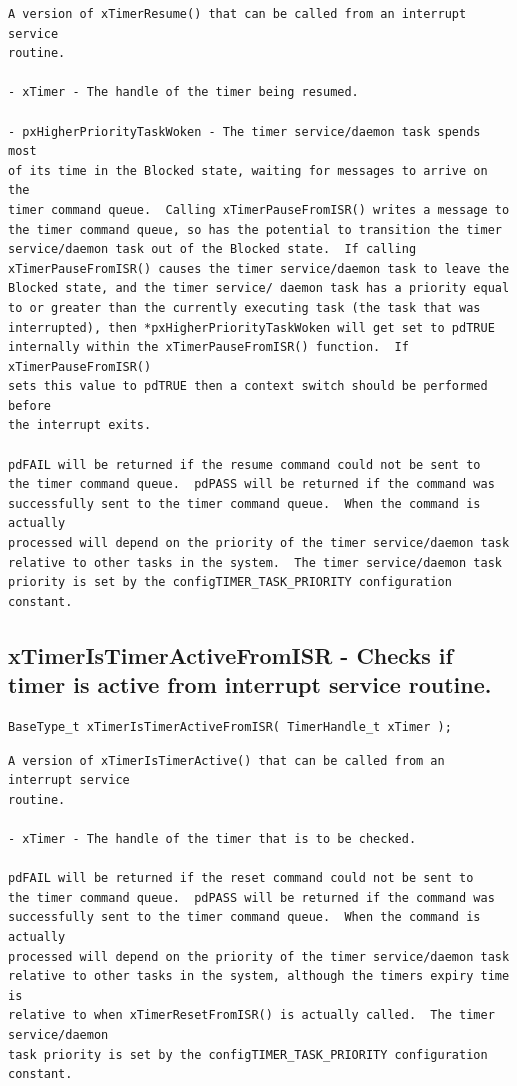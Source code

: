\begin{lstlisting}
A version of xTimerResume() that can be called from an interrupt service
routine.

- xTimer - The handle of the timer being resumed.

- pxHigherPriorityTaskWoken - The timer service/daemon task spends most
of its time in the Blocked state, waiting for messages to arrive on the
timer command queue.  Calling xTimerPauseFromISR() writes a message to
the timer command queue, so has the potential to transition the timer
service/daemon task out of the Blocked state.  If calling
xTimerPauseFromISR() causes the timer service/daemon task to leave the
Blocked state, and the timer service/ daemon task has a priority equal
to or greater than the currently executing task (the task that was
interrupted), then *pxHigherPriorityTaskWoken will get set to pdTRUE
internally within the xTimerPauseFromISR() function.  If xTimerPauseFromISR()
sets this value to pdTRUE then a context switch should be performed before
the interrupt exits.

pdFAIL will be returned if the resume command could not be sent to
the timer command queue.  pdPASS will be returned if the command was
successfully sent to the timer command queue.  When the command is actually
processed will depend on the priority of the timer service/daemon task
relative to other tasks in the system.  The timer service/daemon task
priority is set by the configTIMER_TASK_PRIORITY configuration constant.

\end{lstlisting}
\subsection{xTimerIsTimerActiveFromISR -  Checks if timer is active from interrupt service routine.}
\label{rt_cmd:xTimerIsTimerActiveFromISR}

\begin{verbatim}
BaseType_t xTimerIsTimerActiveFromISR( TimerHandle_t xTimer );
\end{verbatim}
\begin{lstlisting}
A version of xTimerIsTimerActive() that can be called from an interrupt service
routine.

- xTimer - The handle of the timer that is to be checked.

pdFAIL will be returned if the reset command could not be sent to
the timer command queue.  pdPASS will be returned if the command was
successfully sent to the timer command queue.  When the command is actually
processed will depend on the priority of the timer service/daemon task
relative to other tasks in the system, although the timers expiry time is
relative to when xTimerResetFromISR() is actually called.  The timer service/daemon
task priority is set by the configTIMER_TASK_PRIORITY configuration constant.

\end{lstlisting}